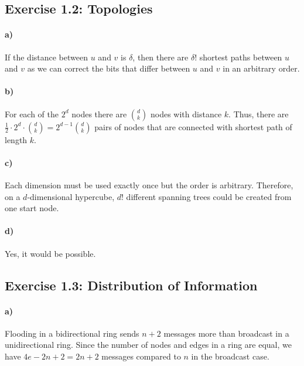 \documentclass[12pt,a4paper]{article}
\begin{document}
\subsection*{Exercise 1.2: Topologies}
\paragraph{a)} %
If the distance between $u$ and $v$ is $\delta$, then there are $\delta!$ shortest paths between $u$ and $v$ as we can correct the bits that differ between $u$ and $v$ in an arbitrary order.
\paragraph{b)} %
For each of the $2^d$ nodes there are $\binom{d}{k}$ nodes with distance $k$.
Thus, there are $\frac{1}{2}\cdot2^d\cdot\binom{d}{k}=2^{d-1}\binom{d}{k}$ pairs of nodes that are connected with shortest path of length $k$.
\paragraph{c)} %
Each dimension must be used exactly once but the order is arbitrary. Therefore, on a $d$-dimensional hypercube, $d!$ different spanning trees could be created from one start node.
\paragraph{d)} %
Yes, it would be possible.

\subsection*{Exercise 1.3: Distribution of Information}
\paragraph{a)} Flooding in a bidirectional ring sends $n+2$ messages more than broadcast in a unidirectional ring. Since the number of nodes and edges in a ring are equal, we have $4e-2n+2=2n+2$ messages compared to $n$ in the broadcast case.
\end{document}
